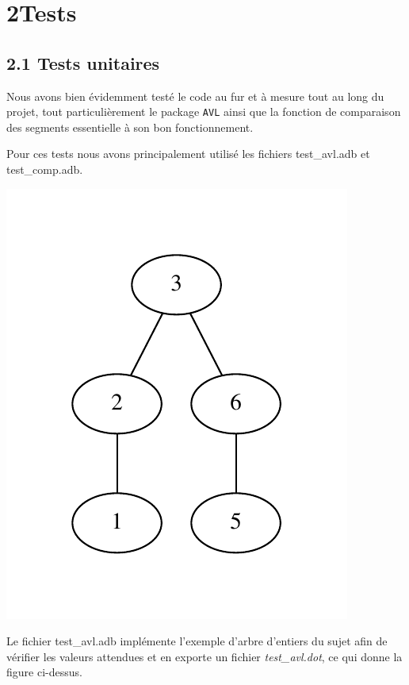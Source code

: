 \documentclass [a4paper,11pt] {report}
\begin{document}
\section* {2\hspace{5mm}Tests }

\subsection* {2.1\hspace{3mm} Tests unitaires}

Nous avons bien évidemment testé le code au fur et à mesure tout au long du projet, tout particulièrement le package \lstinline!AVL! ainsi que la fonction de comparaison des segments essentielle à son bon fonctionnement.

Pour ces tests nous avons principalement utilisé les fichiers test\_avl.adb et test\_comp.adb.

\begin{center}
  \includegraphics[scale=0.75]{avl.pdf}
\end{center}

Le fichier test\_avl.adb implémente l'exemple d'arbre d'entiers du sujet afin de vérifier les valeurs attendues et en exporte un fichier \textit{test\_avl.dot}, ce qui donne la figure ci-dessus.
\end{document}
